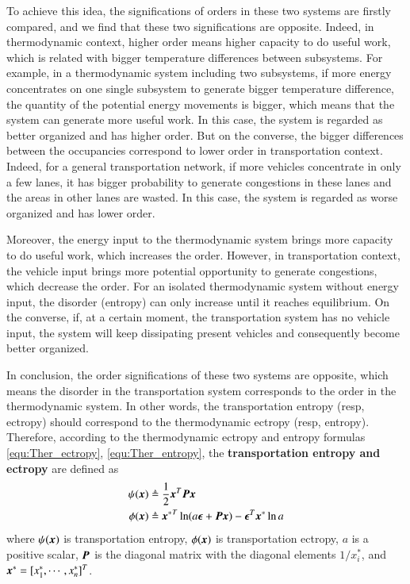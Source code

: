 \documentclass[preprint,authoryear,12pt]{elsarticle}
\renewcommand{\vec}[1]{\mbox{\boldmath$#1$}}
\newcommand{\mat}[1]{\mbox{\boldmath$#1$}}
\begin{document}
To achieve this idea, the significations of orders in these two systems are firstly compared, and we find that these two significations are opposite. Indeed, in thermodynamic context, higher order means higher capacity to do useful work, which is related with bigger temperature differences between subsystems. For example, in a thermodynamic system including two subsystems, if more energy concentrates on one single subsystem to generate bigger temperature difference, the quantity of the potential energy movements is bigger, which means that the system can generate more useful work. In this case, the system is regarded as better organized and has higher order. But on the converse, the bigger differences between the occupancies correspond to lower order in transportation context. Indeed, for a general transportation network, if more vehicles concentrate in only a few lanes, it has bigger probability to generate congestions in these lanes and the areas in other lanes are wasted. In this case, the system is regarded as worse organized and has lower order.

Moreover, the energy input to the thermodynamic system brings more capacity to do useful work, which increases the order. However, in transportation context, the vehicle input brings more potential opportunity to generate congestions, which decrease the order. For an isolated thermodynamic system without energy input, the disorder (entropy) can only increase until it reaches equilibrium. On the converse, if, at a certain moment, the transportation system has no vehicle input, the system will keep dissipating present vehicles and consequently become better organized.

In conclusion, the order significations of these two systems are opposite, which means the disorder in the transportation system corresponds to the order in the thermodynamic system. In other words, the transportation entropy (resp, ectropy) should correspond to the thermodynamic ectropy (resp, entropy). Therefore, according to the thermodynamic ectropy and entropy formulas \eqref{equ:Ther_ectropy}, \eqref{equ:Ther_entropy}, the \textbf{transportation entropy and ectropy} are defined as
\begin{align}
\label{equ:Tran_entropy}
\psi(\vec{x}) &\triangleq \frac{1}{2}\vec{x}^T \mat{P} \vec{x}\\
\phi(\vec{x}) &\triangleq{\vec{x}^*}^T \ln
(a\vec{\epsilon}+\mat{P}\vec{x}) -\vec{\epsilon}^T\vec{x}^*\ln a
\label{equ:Tran_ectropy}
\end{align}
where $\psi(\vec{x})$ is transportation entropy, $\phi(\vec{x})$ is transportation ectropy, $a$ is a positive scalar, $\mat{P}$ is the diagonal matrix with the diagonal elements $1/x_i^*$, and $\vec{x}^*=[x_1^*,\cdots,x_n^*]^T$.
\end{document}
